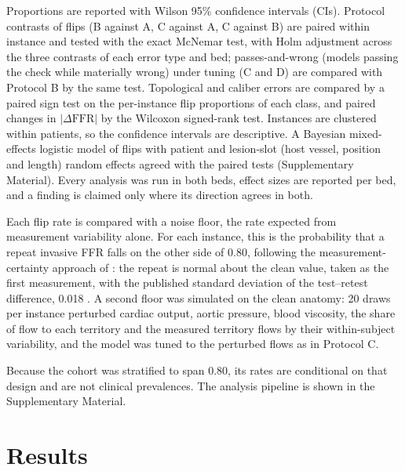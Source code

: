\documentclass[journal,twoside,web]{ieeecolor}
\begin{document}
Proportions are reported with Wilson 95\% confidence intervals (CIs). Protocol contrasts of flips (B against A, C
against A, C against B) are paired within instance and tested with the exact McNemar test, with Holm adjustment
across the three contrasts of each error type and bed; passes-and-wrong (models passing the check while materially wrong) under tuning (C and D) are compared with
Protocol B by the same test. Topological and caliber errors are compared by a paired sign test on
the per-instance flip proportions of each class, and paired changes in $|\Delta\mathrm{FFR}|$ by the Wilcoxon
signed-rank test. Instances are clustered within patients, so the confidence intervals are descriptive. A Bayesian mixed-effects logistic model of flips with patient and lesion-slot (host vessel, position and length) random effects agreed with the paired tests (Supplementary Material). Every analysis was run in both beds, effect sizes are reported per bed, and a finding is
claimed only where its direction agrees in both.

Each flip rate is compared with a noise floor, the rate expected from measurement variability alone. For each instance, this is the probability that a repeat invasive FFR falls on the other side of 0.80, following the measurement-certainty approach of \cite{petraco2013}: the repeat is normal about the clean value, taken as the first measurement, with the published standard deviation of the test--retest difference, 0.018 \cite{johnson2015}. A second floor was simulated on the clean anatomy: 20 draws
per instance perturbed cardiac output, aortic pressure, blood viscosity, the share of flow to each territory and the
measured territory flows by their within-subject variability, and the model was tuned to the perturbed flows as in
Protocol C.

Because the cohort was stratified to span 0.80, its rates are conditional
on that design and are not clinical prevalences. The analysis pipeline is shown in the Supplementary Material.

\section{Results}
\end{document}
